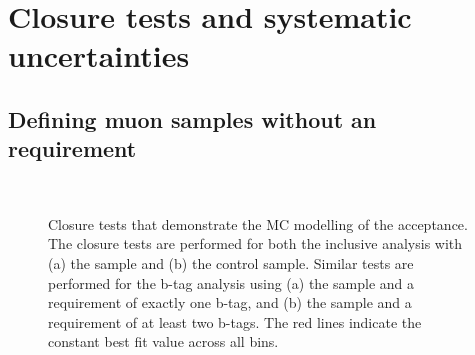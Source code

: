 \newpage
\section{Closure tests and systematic uncertainties}
\label{sec:Closure_tests_and_systematic_uncertainties}
\subsection{Defining muon samples without an \texorpdfstring{\alt}{alphaT} requirement}
\label{app:control-noalphat}


\begin{figure}[h!]
  \begin{center}
     \\
    \caption{Closure tests that demonstrate the MC modelling of the
      \alt acceptance. The closure tests are performed for both the
      inclusive analysis with (a) the \mj sample and (b) the \mmj
      control sample. Similar tests are performed for the b-tag
      analysis using (a) the \mj sample and a requirement of exactly
      one b-tag, and (b) the \mj sample and a requirement of at least
      two b-tags. The red lines indicate the constant best fit value
      across all \HT bins.\label{fig:closure-with-alphat1}}
  \end{center}
\end{figure}

